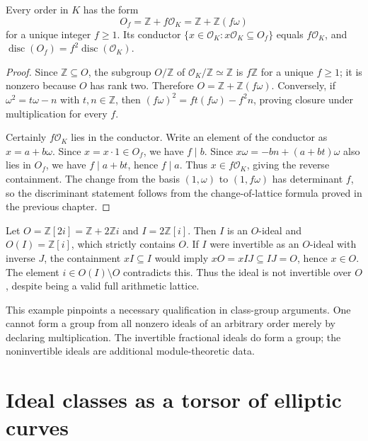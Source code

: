 \begin{theorem}
\label{thm:quadratic-conductor}
Every order in $K$ has the form
\[
 O_f=\mathbb Z+f\mathcal O_K
     =\mathbb Z+\mathbb Z(f\omega)
\]
for a unique integer $f\ge1$. Its conductor
$\{x\in\mathcal O_K:x\mathcal O_K\subseteq O_f\}$ equals
$f\mathcal O_K$, and
$\operatorname{disc}(O_f)=f^2\operatorname{disc}(\mathcal O_K)$.
\end{theorem}

\begin{proof}
Since $\mathbb Z\subseteq O$, the subgroup
$O/\mathbb Z$ of $\mathcal O_K/\mathbb Z\simeq\mathbb Z$
is $f\mathbb Z$ for a unique $f\ge1$; it is nonzero because
$O$ has rank two. Therefore $O=\mathbb Z+\mathbb Z(f\omega)$.
Conversely, if $\omega^2=t\omega-n$ with $t,n\in\mathbb Z$,
then
$(f\omega)^2=ft(f\omega)-f^2n$, proving closure under
multiplication for every $f$.

Certainly $f\mathcal O_K$ lies in the conductor. Write an element
of the conductor as $x=a+b\omega$. Since $x=x\cdot1\in O_f$,
we have $f\mid b$. Since
$x\omega=-bn+(a+bt)\omega$ also lies in $O_f$, we have
$f\mid a+bt$, hence $f\mid a$. Thus
$x\in f\mathcal O_K$, giving the reverse containment.
The change from the basis $(1,\omega)$ to $(1,f\omega)$ has
determinant $f$, so the discriminant statement follows from the
change-of-lattice formula proved in the previous chapter.
\end{proof}

\begin{example}
Let $O=\mathbb Z[2i]=\mathbb Z+2\mathbb Z i$ and
$I=2\mathbb Z[i]$. Then $I$ is an $O$-ideal and
$O(I)=\mathbb Z[i]$, which strictly contains $O$. If $I$ were
invertible as an $O$-ideal with inverse $J$, the containment
$xI\subseteq I$ would imply
$xO=xIJ\subseteq IJ=O$, hence $x\in O$. The element
$i\in O(I)\setminus O$ contradicts this. Thus the ideal is
not invertible over $O$, despite being a valid full
arithmetic lattice.
\end{example}

This example pinpoints a necessary qualification in class-group
arguments. One cannot form a group from all nonzero ideals of an
arbitrary order merely by declaring multiplication. The invertible
fractional ideals do form a group; the noninvertible ideals are
additional module-theoretic data.

\section{Ideal classes as a torsor of elliptic curves}

